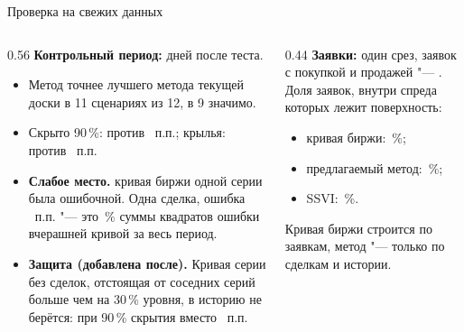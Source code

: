 \documentclass[aspectratio=169]{beamer}
\begin{document}
\begin{frame}{Проверка на свежих данных}
    \begin{columns}[T]
    \begin{column}{0.56\textwidth}
        \small
        \textbf{Контрольный период:}  дней после теста.
        \begin{itemize}
            \item Метод точнее лучшего метода текущей доски в 11 сценариях из 12, в 9 значимо.
            \item Скрыто 90\,\%:  против ~п.п.; крылья:  против ~п.п.
            \item \textbf{Слабое место.}  кривая биржи одной серии была ошибочной. Одна сделка, ошибка ~п.п. "--- это \,\% суммы квадратов ошибки вчерашней кривой за весь период.
            \item \textbf{Защита (добавлена после).} Кривая серии без сделок, отстоящая от соседних серий больше чем на 30\,\% уровня, в историю не берётся: при 90\,\% скрытия  вместо ~п.п.
        \end{itemize}
    \end{column}
    \begin{column}{0.44\textwidth}
        \textbf{Заявки:} один срез, заявок с покупкой и продажей "--- . Доля заявок, внутри спреда которых лежит поверхность:
        \begin{itemize}
            \item кривая биржи: \,\%;
            \item предлагаемый метод: \,\%;
            \item SSVI: \,\%.
        \end{itemize}
        Кривая биржи строится по заявкам, метод "--- только по сделкам и истории.
    \end{column}
    \end{columns}
\end{frame}
\end{document}
